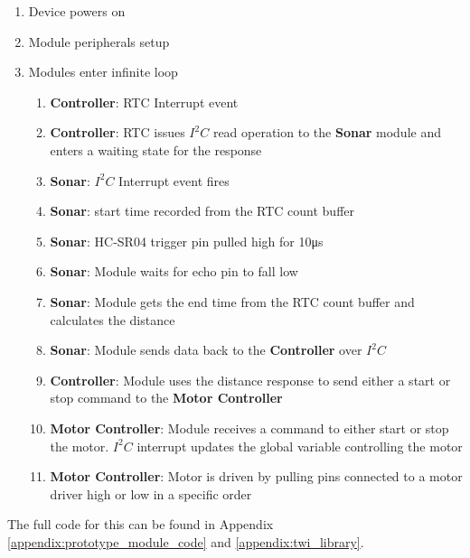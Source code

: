 \documentclass[11pt,a4paper,titlepage]{report}
\begin{document}
	\begin{enumerate}
		\item Device powers on
		\item Module peripherals setup
		\item Modules enter infinite loop
		\begin{enumerate}
			\item \textbf{Controller}: RTC Interrupt event
			\item \textbf{Controller}: RTC issues $I^{2}C$ read operation to the \textbf{Sonar} module and enters a waiting state for the response
			\item \textbf{Sonar}: $I^{2}C$ Interrupt event fires
			\item \textbf{Sonar}: start time recorded from the RTC count buffer
			\item \textbf{Sonar}: HC-SR04 trigger pin pulled high for 10\unit{\micro\second}
			\item \textbf{Sonar}: Module waits for echo pin to fall low
			\item \textbf{Sonar}: Module gets the end time from the RTC count buffer and calculates the distance
			\item \textbf{Sonar}: Module sends data back to the \textbf{Controller} over $I^{2}C$
			\item \textbf{Controller}: Module uses the distance response to send either a start or stop command to the \textbf{Motor Controller}
			\item \textbf{Motor Controller}: Module receives a command to either start or stop the motor. $I^{2}C$ interrupt updates the global variable controlling the motor
			\item \textbf{Motor Controller}: Motor is driven by pulling pins connected to a motor driver high or low in a specific order
		\end{enumerate}
	\end{enumerate}
	
	The full code for this can be found in Appendix \ref{appendix:prototype_module_code} and \ref{appendix:twi_library}.
	
\end{document}
